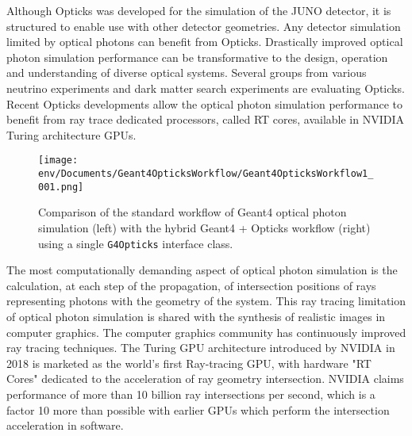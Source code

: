 \documentclass{webofc}
\begin{document}
Although Opticks was developed for the simulation of the JUNO detector, it 
is structured to enable use with other detector geometries. 
Any detector simulation limited by optical photons 
can benefit from Opticks.
Drastically improved optical photon simulation performance can be transformative 
to the design, operation and understanding of diverse optical systems.
%
Several groups from various neutrino experiments and dark matter search experiments are 
evaluating Opticks.
%
Recent Opticks developments allow the optical photon simulation performance 
to benefit from ray trace dedicated processors, called RT cores\cite{rtx}, 
available in NVIDIA Turing architecture GPUs.
%
%
\begin{figure}
\centering
\texttt{[image: env/Documents/Geant4OpticksWorkflow/Geant4OpticksWorkflow1\_001.png]}
\caption{Comparison of the standard workflow of Geant4 optical photon simulation (left) with the hybrid Geant4 + Opticks workflow (right)
using a single {\tt G4Opticks} interface class.
}
\label{workflow} 
\end{figure}
%
%
%

The most computationally demanding aspect of optical photon simulation 
is the calculation, at each step of the propagation, 
of intersection positions of rays representing photons with the geometry of the system.
This ray tracing limitation of optical photon simulation is shared 
with the synthesis of realistic images in computer graphics. 
The computer graphics community has continuously improved ray tracing techniques. The Turing GPU architecture 
introduced by NVIDIA in 2018 is marketed as the world's first Ray-tracing GPU, with   
hardware "RT Cores" 
dedicated to the 
acceleration of ray geometry intersection.
NVIDIA claims performance of more than 10 billion ray intersections 
per second, which is a factor 10 more than possible with earlier GPUs
which perform the intersection acceleration in software. 
%
%
\label{secworkflow}
%
\end{document}
